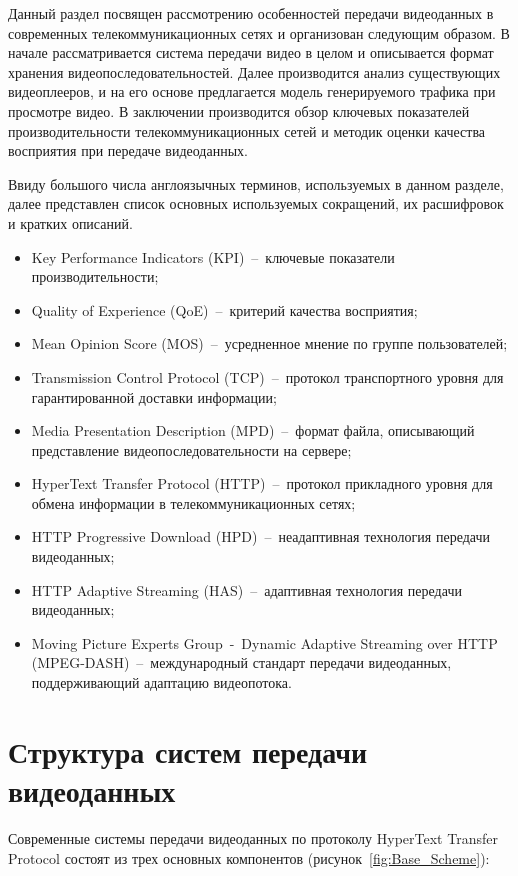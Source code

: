 Данный раздел посвящен рассмотрению особенностей передачи видеоданных в современных телекоммуникационных сетях и организован следующим образом. В начале рассматривается система передачи видео в целом и описывается формат хранения видеопоследовательностей. Далее производится анализ существующих видеоплееров, и на его основе предлагается модель генерируемого трафика при просмотре видео. В заключении производится обзор ключевых показателей производительности телекоммуникационных сетей и методик оценки качества восприятия при передаче видеоданных.

Ввиду большого числа англоязычных терминов, используемых в данном разделе, далее представлен список основных используемых сокращений, их расшифровок и кратких описаний.
\begin{itemize}
  \item Key Performance Indicators (KPI)~--~ключевые показатели производительности;
  \item Quality of Experience (QoE)~--~критерий качества восприятия;
  \item Mean Opinion Score (MOS)~--~усредненное мнение по группе пользователей;
  \item Transmission Control Protocol (TCP)~--~протокол транспортного уровня для гарантированной доставки информации;
  \item Media Presentation Description (MPD)~--~формат файла, описывающий представление видеопоследовательности на сервере;
  \item HyperText Transfer Protocol (HTTP)~--~протокол прикладного уровня для обмена информации в телекоммуникационных сетях;
  \item HTTP Progressive Download (HPD)~--~неадаптивная технология передачи видеоданных;
  \item HTTP Adaptive Streaming (HAS)~--~адаптивная технология передачи видеоданных;
  \item Moving Picture Experts Group~-~Dynamic Adaptive Streaming over HTTP (MPEG-DASH)~--~международный стандарт передачи видеоданных, поддерживающий адаптацию видеопотока.
\end{itemize}

\section{Структура систем передачи видеоданных}\label{chap1:SystemStructure}

Современные системы передачи видеоданных по протоколу HyperText Transfer Protocol состоят из трех основных компонентов (рисунок~\ref{fig:Base_Scheme}):

